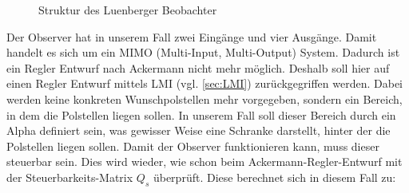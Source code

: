 \begin{figure}[H]
   \centering
   \caption[Beobachter-Reglerstruktur]{Struktur des Luenberger Beobachter}
   \label{fig:Bild8.1}
\end{figure}

Der Observer hat in unserem Fall zwei Eingänge und vier Ausgänge. Damit handelt es sich um ein MIMO (Multi-Input, Multi-Output) System. Dadurch ist ein Regler Entwurf nach Ackermann nicht mehr möglich.
Deshalb soll hier auf einen Regler Entwurf mittels LMI (vgl. \autoref{sec:LMI})  zurückgegriffen werden. Dabei werden keine konkreten Wunschpolstellen mehr vorgegeben, sondern ein Bereich, in dem die Polstellen liegen sollen. In unserem Fall soll dieser Bereich durch ein Alpha definiert sein, was gewisser Weise eine Schranke darstellt, hinter der die Polstellen liegen sollen.
Damit der Observer funktionieren kann, muss dieser steuerbar sein. Dies wird wieder, wie schon beim Ackermann-Regler-Entwurf mit der Steuerbarkeits-Matrix $Q_s$ überprüft. Diese berechnet sich in diesem Fall zu:


